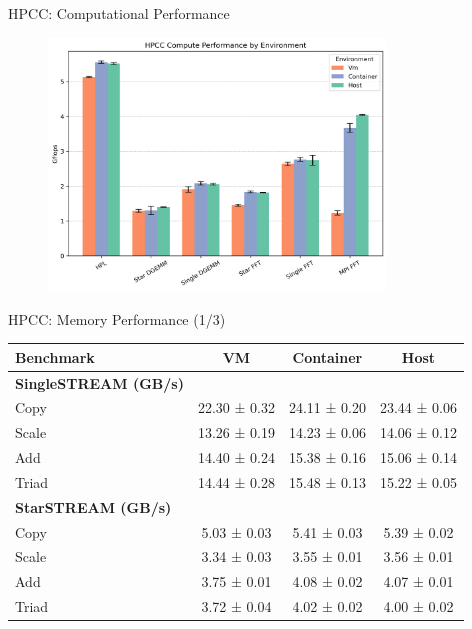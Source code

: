 \documentclass[10pt]{beamer}
\begin{document}
\begin{frame}{HPCC: Computational Performance}
\begin{figure}
  \centering
  \includegraphics[width=0.8\textwidth]{hpcc_compute_performance.png}
\end{figure}

\end{frame}


\begin{frame}{HPCC: Memory Performance (1/3)}

  \begin{table}[htbt]
  \centering
  \begin{tabular}{lccc}
  \toprule
  \textbf{Benchmark} & \textbf{VM} & \textbf{Container} & \textbf{Host} \\
  \midrule
  \textbf{SingleSTREAM (GB/s)} & & & \\
  Copy   & 22.30 ± 0.32 & 24.11 ± 0.20 & 23.44 ± 0.06 \\
  Scale  & 13.26 ± 0.19 & 14.23 ± 0.06 & 14.06 ± 0.12 \\
  Add    & 14.40 ± 0.24 & 15.38 ± 0.16 & 15.06 ± 0.14 \\
  Triad  & 14.44 ± 0.28 & 15.48 ± 0.13 & 15.22 ± 0.05 \\
  \midrule
  \textbf{StarSTREAM (GB/s)} & & & \\
  Copy   & 5.03 ± 0.03 & 5.41 ± 0.03 & 5.39 ± 0.02 \\
  Scale  & 3.34 ± 0.03 & 3.55 ± 0.01 & 3.56 ± 0.01 \\
  Add    & 3.75 ± 0.01 & 4.08 ± 0.02 & 4.07 ± 0.01 \\
  Triad  & 3.72 ± 0.04 & 4.02 ± 0.02 & 4.00 ± 0.02 \\
  \bottomrule
  \end{tabular}
  \end{table}

\end{frame}
\end{document}
